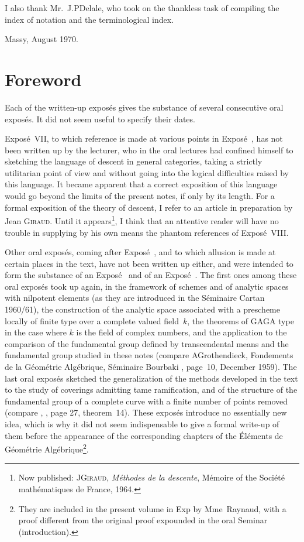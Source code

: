 I also thank Mr.~J.P\ptbl Delale, who took on the thankless task of
compiling the index of notation and the terminological index.

\bigskip\hfill Massy, August 1970.

\renewcommand{\thesubsection}{\thesection.\arabic{subsection}}

\chapter*{Foreword}
\label{I.avertissement}

Each of the written-up expos\'es gives the substance of several
consecutive oral expos\'es. It did not seem useful to specify their dates.

Expos\'e~VII, to which reference is made at various points in
Expos\'e~, has not been written up by the lecturer, who in the
oral lectures had confined himself to sketching the language of descent
in general categories, taking a strictly utilitarian point of view and
without going into the logical difficulties raised by this language. It
became apparent that a correct exposition of this language would go
beyond the limits of the present notes, if only by its length. For a
formal exposition of the theory of descent, I refer to an article in
preparation by Jean \textsc{Giraud}. Until it
appears\footnote{\label{footnotegiraud}Now published:
J\ptbl \textsc{Giraud}, \emph{M\'ethodes de la descente}, M\'emoire
 of the Soci\'et\'e math\'ematiques de France, 1964.}, I think that
an attentive reader will have no trouble in supplying by his own means
the phantom references of Expos\'e~VIII.

Other oral expos\'es, coming after Expos\'e~, and to which allusion
is made at certain places in the text, have not been written up either,
and were intended to form the substance of an Expos\'e~ and of an
Expos\'e~. The first ones among these oral expos\'es took up again, in the
framework of schemes and of analytic spaces with nilpotent elements (as
they are introduced in the S\'eminaire Cartan 1960/61), the
construction of the analytic space associated with a prescheme locally
of finite type over a complete valued field~$k$, the theorems of GAGA
type in the case where $k$ is the field of complex numbers, and the
application to the comparison of the fundamental group defined by
transcendental means and the fundamental group studied in these notes
(compare A\ptbl Grothendieck, Fondements de la G\'eom\'etrie
Alg\'ebrique, S\'eminaire Bourbaki , page~10, December 1959). The
last oral expos\'es sketched the generalization of the methods developed
in the text to the study of coverings admitting tame ramification, and
of the structure of the fundamental group of a complete curve with a
finite number of points removed (compare \loccit, , page 27,
theorem~14). These expos\'es introduce no essentially new idea, which is
why it did not seem indispensable to give a formal write-up of them
before the appearance of the corresponding chapters of the \'El\'ements
de G\'eom\'etrie Alg\'ebrique\footnote{They are included in the present
volume in Exp\ptbl {} by Mme~Raynaud, with a proof different from
the original proof expounded in the oral Seminar (\cf introduction).}.

